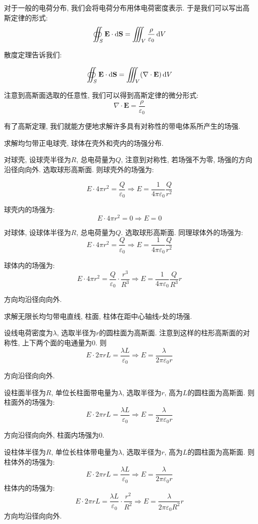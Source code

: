 对于一般的电荷分布, 我们会将电荷分布用体电荷密度表示. 于是我们可以写出高斯定律的形式:
  \[
  \oiint_S \mathbf{E} \cdot \mathop{}\!\mathrm{d}\mathbf{S} = \iiint_V \frac{\rho}{\varepsilon_0} \mathop{}\!\mathrm{d} V
  \]

散度定理告诉我们:

\[
\oiint_S \mathbf{E} \cdot \mathop{}\!\mathrm{d} \mathbf{S} = \iiint_V (\nabla \cdot \mathbf{E}) \mathop{}\!\mathrm{d} V
\]

注意到高斯面选取的任意性, 我们可以得到高斯定律的微分形式:
\[
\nabla \cdot \mathbf{E} = \frac{\rho}{\varepsilon_0}
\]


有了高斯定理, 我们就能方便地求解许多具有对称性的带电体系所产生的场强.
\begin{example}
  求解均匀带正电球壳, 球体在壳外和壳内的场强分布.

  对球壳, 设球壳半径为$R$, 总电荷量为$Q$, 注意到对称性, 若场强不为零, 场强的方向沿径向向外. 选取球形高斯面. 则球壳外的场强为:

  \[
  E \cdot 4\pi r^2 = \frac{Q}{\varepsilon_0} \Rightarrow E = \frac{1}{4\pi\varepsilon_0} \frac{Q}{r^2}
  \]

  球壳内的场强为:
  \[
  E \cdot 4\pi r^2 = 0 \Rightarrow E = 0
  \]

  对球体, 设球体半径为$R$, 总电荷量为$Q$. 选取球形高斯面. 同理球体外的场强为:
  \[
  E \cdot 4\pi r^2 = \frac{Q}{\varepsilon_0} \Rightarrow E = \frac{1}{4\pi\varepsilon_0} \frac{Q}{r^2}
  \]

  球体内的场强为:
  \[
  E \cdot 4\pi r^2 = \frac{Q}{\varepsilon_0} \cdot \frac{r^3}{R^3} \Rightarrow E = \frac{1}{4\pi\varepsilon_0} \frac{Q}{R^3} r
  \]

  方向均沿径向向外.
\end{example}

\begin{example}
  求解无限长均匀带电直线, 柱面, 柱体在距中心轴线$r$处的场强.

  设线电荷密度为$\lambda$, 选取半径为$r$的圆柱面为高斯面. 注意到这样的柱形高斯面的对称性, 上下两个面的电通量为0. 则
  \[
  E \cdot 2\pi r L = \frac{\lambda L}{\varepsilon_0} \Rightarrow E = \frac{\lambda}{2\pi\varepsilon_0 r}
  \]

  方向沿径向向外.

  设柱面半径为$R$, 单位长柱面带电量为$\lambda$, 选取半径为$r$, 高为$L$的圆柱面为高斯面. 则柱面外的场强为:
  \[
  E \cdot 2\pi r L = \frac{\lambda L}{\varepsilon_0} \Rightarrow E = \frac{\lambda}{2\pi\varepsilon_0 r}
  \]

  方向沿径向向外, 柱面内场强为0.

  设柱体半径为$R$, 单位长柱体带电量为$\lambda$, 选取半径为$r$, 高为$L$的圆柱面为高斯面. 则柱体外的场强为:
  \[
  E \cdot 2\pi r L = \frac{\lambda L}{\varepsilon_0} \Rightarrow E = \frac{\lambda}{2\pi\varepsilon_0 r}
  \]
  柱体内的场强为:
  \[
  E \cdot 2\pi r L = \frac{\lambda L}{\varepsilon_0} \cdot \frac{r^2}{R^2} \Rightarrow E = \frac{\lambda}{2\pi\varepsilon_0 R^2} r
  \]
  方向均沿径向向外.
\end{example}

